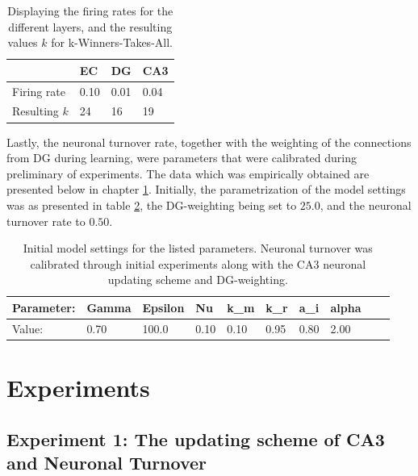 \begin{table}[]
\centering
\caption{Displaying the firing rates for the different layers, and the resulting values $k$ for k-Winners-Takes-All.}
\label{table:firing_rates}
\begin{tabular}{l|l|l|l|}
\cline{2-4}
                                  & EC   & DG   & CA3  \\ \hline
\multicolumn{1}{|l|}{Firing rate} & 0.10 & 0.01 & 0.04 \\ \hline
\multicolumn{1}{|l|}{Resulting $k$} & 24 & 16 & 19 \\ \hline
\end{tabular}
\end{table}

Lastly, the neuronal turnover rate, together with the weighting of the connections from DG during learning, were parameters that were calibrated during preliminary of experiments. The data which was empirically obtained are presented below in chapter \ref{section:experiments}. Initially, the parametrization of the model settings was as presented in table \ref{table:initial_settings}, the DG-weighting being set to $25.0$, and the neuronal turnover rate to $0.50$.

\begin{table}[]
\centering
\caption{Initial model settings for the listed parameters. Neuronal turnover was calibrated through initial experiments along with the CA3 neuronal updating scheme and DG-weighting.}
\label{table:initial_settings}
\begin{tabular}{|l|l|l|l|l|l|l|l|l|l|}
\cline{1-8}
Parameter: & Gamma & Epsilon & Nu   & k\_m & k\_r & a\_i & alpha \\ \hline
Value:     & 0.70  & 100.0   & 0.10 & 0.10 & 0.95 & 0.80 & 2.00 \\ \hline
\end{tabular}
\end{table}


\section{Experiments}\label{section:experiments}

\subsection{Experiment 1: The updating scheme of CA3 and Neuronal Turnover}

